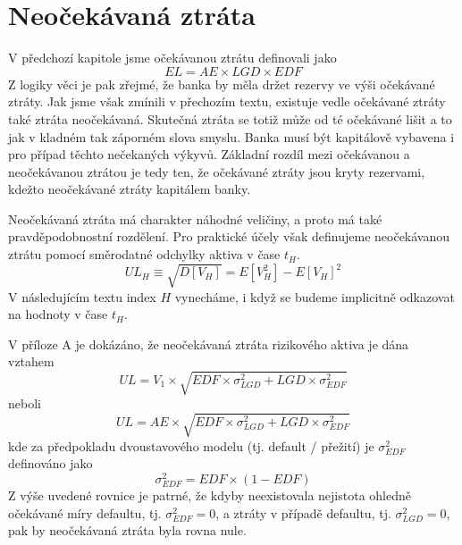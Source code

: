 \chapter{Neočekávaná ztráta}

V předchozí kapitole jsme očekávanou ztrátu definovali jako
\begin{equation}
EL = AE \times LGD \times EDF
\end{equation}
Z logiky věci je pak zřejmé, že banka by měla držet rezervy ve výši očekávané ztráty. Jak jsme však zmínili v přechozím textu, existuje vedle očekávané ztráty také ztráta neočekávaná. Skutečná ztráta se totiž může od té očekávané lišit a to jak v kladném tak záporném slova smyslu. Banka musí být kapitálově vybavena i pro případ těchto nečekaných výkyvů. Základní rozdíl mezi očekávanou a neočekávanou ztrátou je tedy ten, že očekávané ztráty jsou kryty rezervami, kdežto neočekávané ztráty kapitálem banky.

Neočekávaná ztráta má charakter náhodné veličiny, a proto má také pravděpodobnostní rozdělení. Pro praktické účely však definujeme neočekávanou ztrátu pomocí směrodatné odchylky aktiva v čase $t_H$.
\begin{equation}
UL_H \equiv \sqrt{D[V_H]} = E[V_H^2] - E[V_H]^2
\end{equation}
V následujícím textu index $H$ vynecháme, i když se budeme implicitně odkazovat na hodnoty v čase $t_H$.

V příloze A je dokázáno, že neočekávaná ztráta rizikového aktiva je dána vztahem
\begin{equation}
UL = V_1 \times \sqrt{EDF \times \sigma_{LGD}^2 + LGD \times \sigma_{EDF}^2}
\end{equation}
neboli
\begin{equation}
UL = AE \times \sqrt{EDF \times \sigma_{LGD}^2 + LGD \times \sigma_{EDF}^2}
\end{equation}
kde za předpokladu dvoustavového modelu (tj. default / přežití) je $\sigma_{EDF}^2$ definováno jako
\begin{equation}
\sigma_{EDF}^2 = EDF \times (1 - EDF)
\end{equation}
Z výše uvedené rovnice je patrné, že kdyby neexistovala nejistota ohledně očekávané míry defaultu, tj. $\sigma_{EDF}^2 = 0$, a ztráty v případě defaultu, tj. $\sigma_{LGD}^2 = 0$, pak by neočekávaná ztráta byla rovna nule.

